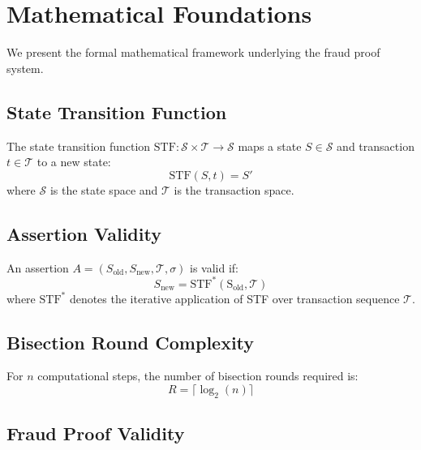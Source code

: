 \section{Mathematical Foundations}


We present the formal mathematical framework underlying the fraud proof system.

\subsection{State Transition Function}

\begin{definition}
The state transition function $\text{STF}: \mathcal{S} \times \mathcal{T} \rightarrow \mathcal{S}$ maps a state $S \in \mathcal{S}$ and transaction $t \in \mathcal{T}$ to a new state:
\begin{equation}
\text{STF}(S, t) = S'
\end{equation}
where $\mathcal{S}$ is the state space and $\mathcal{T}$ is the transaction space.
\end{definition}

\subsection{Assertion Validity}

\begin{definition}
An assertion $A = (S_{\text{old}}, S_{\text{new}}, \mathcal{T}, \sigma)$ is valid if:
\begin{equation}
S_{\text{new}} = \text{STF}^*(\text{S}_{\text{old}}, \mathcal{T})
\end{equation}
where $\text{STF}^*$ denotes the iterative application of STF over transaction sequence $\mathcal{T}$.
\end{definition}

\subsection{Bisection Round Complexity}

\begin{theorem}
For $n$ computational steps, the number of bisection rounds required is:
\begin{equation}
R = \lceil\log_2(n)\rceil
\end{equation}
\end{theorem}

\subsection{Fraud Proof Validity}

